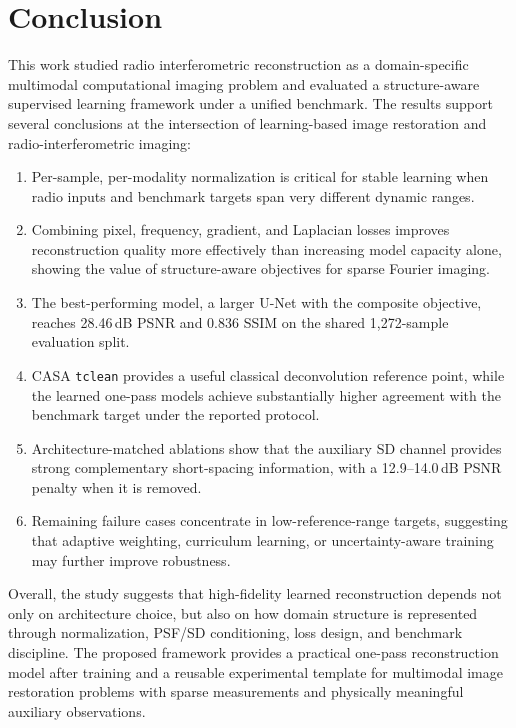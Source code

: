 \documentclass[twocolumn]{aastex631}
\begin{document}
\section{Conclusion}
\label{sec:conclusion}

This work studied radio interferometric reconstruction as a domain-specific multimodal computational imaging problem and evaluated a structure-aware supervised learning framework under a unified benchmark.
The results support several conclusions at the intersection of learning-based image restoration and radio-interferometric imaging:

\begin{enumerate}
	\item Per-sample, per-modality normalization is critical for stable learning when radio inputs and benchmark targets span very different dynamic ranges.
	\item Combining pixel, frequency, gradient, and Laplacian losses improves reconstruction quality more effectively than increasing model capacity alone, showing the value of structure-aware objectives for sparse Fourier imaging.
	\item The best-performing model, a larger U-Net with the composite objective, reaches 28.46\,dB PSNR and 0.836 SSIM on the shared 1,272-sample evaluation split.
	\item CASA \texttt{tclean} provides a useful classical deconvolution reference point, while the learned one-pass models achieve substantially higher agreement with the benchmark target under the reported protocol.
	\item Architecture-matched ablations show that the auxiliary SD channel provides strong complementary short-spacing information, with a 12.9--14.0\,dB PSNR penalty when it is removed.
	\item Remaining failure cases concentrate in low-reference-range targets, suggesting that adaptive weighting, curriculum learning, or uncertainty-aware training may further improve robustness.
\end{enumerate}

Overall, the study suggests that high-fidelity learned reconstruction depends not only on architecture choice, but also on how domain structure is represented through normalization, PSF/SD conditioning, loss design, and benchmark discipline.
The proposed framework provides a practical one-pass reconstruction model after training and a reusable experimental template for multimodal image restoration problems with sparse measurements and physically meaningful auxiliary observations.
\end{document}
